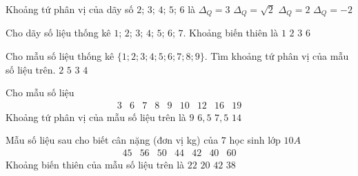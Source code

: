 

\begin{ex}%
	Khoảng tứ phân vị của dãy  số $2$; $3$; $4$; $5$; $6$ là
	\choice 
		{\True  $\Delta_Q=3$}
		 {$\Delta_Q=\sqrt{2}$}
		{$\Delta_Q=2$} 
		 {$\Delta_Q=-2$}
\end{ex}

\begin{ex}%
	Cho dãy số liệu thống kê $1$; $2$; $3$; $4$; $5$; $6$; $7$. Khoảng biến  thiên là
	\choice 
		 {$1$}
		 {$2$}
		{$3$} 
		{\True  $6$}
\end{ex}

\begin{ex}%
	Cho mẫu số liệu thống kê $\{ 1;2;3;4;5;6;7;8;9 \}$. Tìm khoảng tứ phân  vị của mẫu số liệu trên.
	 \choice
		 {$2$}
		 {\True $5$}
		 {$3$}
		{$4$} 
\end{ex}

\begin{ex}%
	Cho  mẫu số liệu
	$$\begin{array}{lllllllll}
	3 & 6 & 7 & 8 &  9 & 10 & 12 & 16 & 19
\end{array}$$
Khoảng  tứ phân vị của mẫu số liệu trên là
 \choice
	{$9$} 
	{$6{,}5$} 
	 {\True $7{,}5$}
	 {$14$}
\end{ex}

\begin{ex}%
	Mẫu số liệu sau cho biết cân nặng  (đơn vị kg) của $7$ học sinh lớp $10A$
	$$ 
	\begin{array}{lllllll}
		45 & 56 & 50 & 44 &  42 & 40 & 60
	\end{array}
	$$ 
	Khoảng biến thiên của mẫu số liệu  trên là
	 \choice
		{$22$} 
		 {\True $20$}
		{$42$} 
		{$38$} 
\end{ex}

